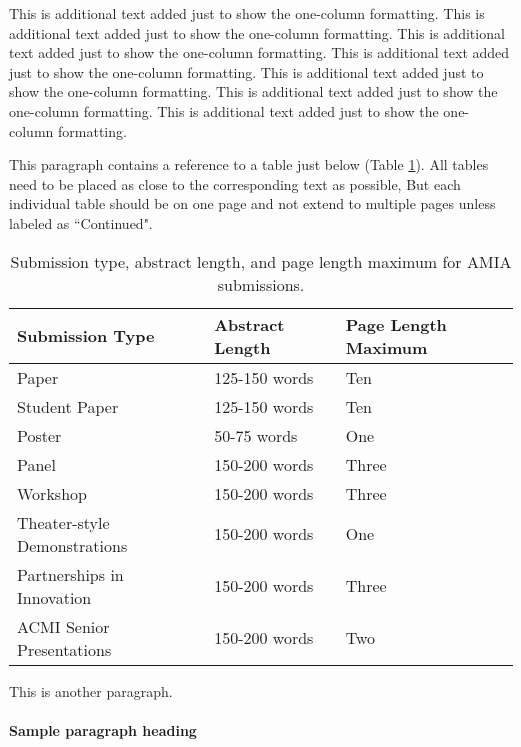 \documentclass{amia}
\begin{document}
This is additional text added just to show the one-column formatting. This is additional text added just to show the one-column formatting. This is additional text added just to show the one-column formatting.  This is additional text added just to show the one-column formatting. This is additional text added just to show the one-column formatting. This is additional text added just to show the one-column formatting.  This is additional text added just to show the one-column formatting.

This paragraph contains a reference to a table just below (Table \ref{tab:submission}).  All tables need to be placed as close to the corresponding text as possible, But each individual table should be on one page and not extend to multiple pages unless labeled as ``Continued".

\begin{table}[H]
	\caption{Submission type, abstract length, and page length maximum for AMIA submissions.}
	\label{tab:submission}
\begin{center}
\begin{tabular}{|l|l|l|}
\hline
Submission Type	            &Abstract Length	&Page Length Maximum \\
\hline
Paper                       &125-150 words	    &Ten                 \\
\hline 
Student Paper	            &125-150 words	    &Ten                 \\
\hline
Poster                      &50-75 words        &One                 \\
\hline
Panel	                    &150-200 words      &Three               \\
\hline
Workshop	                &150-200 words      &Three               \\
\hline
Theater-style Demonstrations&150-200 words	    &One                 \\
\hline
Partnerships in Innovation	&150-200 words	    &Three               \\
\hline
ACMI Senior Presentations	&150-200 words	    &Two                 \\
\hline
\end{tabular}
\end{center}

\end{table}

This is another paragraph.

\paragraph{Sample paragraph heading}\lipsum[1]
\end{document}
